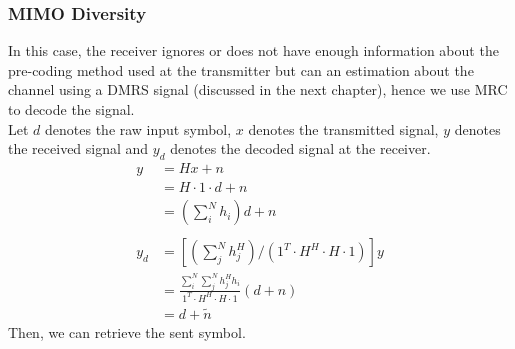 \subsubsection{MIMO Diversity}
In this case, the receiver ignores or does not have enough information about the pre-coding method used at the transmitter but can an estimation about the channel using a DMRS signal (discussed in the next chapter), hence we use MRC to decode the signal. \\
Let $d$ denotes the raw input symbol, $x$ denotes the transmitted signal, $y$ denotes the received signal and $y_d$ denotes the decoded signal at the receiver.
\begin{equation}
    \label{eq: MIMO div using MRC}
    \begin{aligned}
        y &= Hx + n \\
        &= H \cdot 1 \cdot d + n \\
        &= \left( \sum_i^N h_i \right) d + n \\
        \\
        y_d &= \left[ \left( \sum_j^N h^H_j \right) / \left( 1^T \cdot H^H \cdot H \cdot 1 \right) \right] y \\
        &= \frac{ \sum_i^N \sum_j^N h^H_j h_i }{1^T \cdot H^H \cdot H \cdot 1} (d + n) \\
        &= d + \tilde{n}
    \end{aligned}
\end{equation}
Then, we can retrieve the sent symbol.